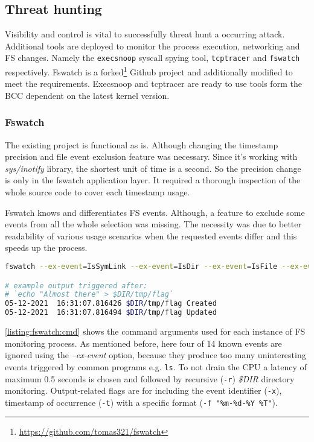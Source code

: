 \subsection{Threat hunting \label{implementation:mon:hunting}}
Visibility and control is vital to successfully threat hunt a occurring attack. Additional tools are deployed to monitor the process execution, networking and FS changes. Namely the \texttt{execsnoop} syscall spying tool, \texttt{tcptracer} and \texttt{fswatch} respectively. Fswatch is a forked\footnote{\url{https://github.com/tomas321/fswatch}} Github project and additionally modified to meet the requirements. Execsnoop and tcptracer are ready to use tools form the BCC dependent on the latest kernel version.

\subsubsection*{Fswatch \label{implementation:mon:hunting:fswatch}}
The existing project is functional as is. Although changing the timestamp precision and file event exclusion feature was necessary. Since it's working with \textit{sys/inotify} library, the shortest unit of time is a second. So the precision change is only in the fswatch application layer. It required a thorough inspection of the whole source code to cover each timestamp usage.

Fswatch knows and differentiates FS events. Although, a feature to exclude some events from all the whole selection was missing. The necessity was due to better readability of various usage scenarios when the requested events differ and this speeds up the process.

\begin{lstlisting}[language=bash, style=custom, caption={}, label=listing:fswatch:cmd]
fswatch --ex-event=IsSymLink --ex-event=IsDir --ex-event=IsFile --ex-event=PlatformSpecific -l 0.5 -r -x -t -f "%m-%d-%Y  %T" $DIR

# example output triggered after:
# `echo "Almost there" > $DIR/tmp/flag`
05-12-2021  16:31:07.816426 $DIR/tmp/flag Created
05-12-2021  16:31:07.816494 $DIR/tmp/flag Updated
\end{lstlisting}
\autoref{listing:fswatch:cmd} shows the command arguments used for each instance of FS monitoring process. As mentioned before, here four of 14 known events are ignored using the \textit{--ex-event} option, because they produce too many uninteresting events triggered by common programs e.g. \texttt{ls}. To not drain the CPU a latency of maximum 0.5 seconds is chosen and followed by recursive (\texttt{-r}) \textit{\$DIR} directory monitoring. Output-related flags are for including the event identifier (\texttt{-x}), timestamp of occurrence (\texttt{-t}) with a specific format (\texttt{-f "\%m-\%d-\%Y  \%T"}).

